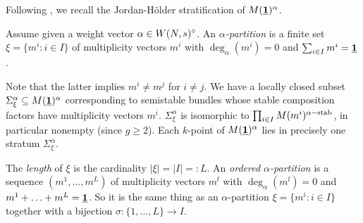 \documentclass{article}
\begin{document}
Following \cite{boden}, we recall the Jordan-H\"older stratification of $M(\underline{\mathbf{1}})^{\alpha}$.
\begin{defn}
  Assume given a weight vector $\alpha \in W(N, s)^{\circ}$. An \emph{$\alpha$-partition} is a finite set $\xi = \{m^i: i \in I\}$ of multiplicity vectors
  $m^i$ with $\deg_{\alpha}(m^i) = 0$ and $\sum_{i \in I} m^i = \underline{\mathbf{1}}$.
\end{defn}

Note that the latter implies $m^i \neq m^j$ for $i \neq j$. We have a locally closed subset $\Sigma^{\alpha}_{\xi} \subseteq M(\underline{\mathbf{1}})^{\alpha}$
corresponding to semistable bundles whose stable composition factors have multiplicity vectors $m^i$. $\Sigma^{\alpha}_{\xi}$ is isomorphic to $\prod_{i
\in I} M(m^i)^{\alpha-\mathrm{stab}}$, in particular nonempty (since $g \geq 2$). Each $k$-point of $M(\underline{\mathbf{1}})^{\alpha}$ lies in precisely one stratum
$\Sigma^{\alpha}_{\xi}$.

The \emph{length} of $\xi$ is the cardinality $|\xi| = |I| =: L$. An \emph{ordered $\alpha$-partition} is a sequence $(m^1, \ldots, m^L)$ of multiplicity
vectors $m^l$ with $\deg_{\alpha}(m^l) = 0$ and $m^1 + \ldots + m^L = \underline{\mathbf{1}}$. So it is the same thing as an $\alpha$-partition $\xi = \{m^i: i \in I\}$
together with a bijection $\sigma: \{1, \ldots, L\} \to I$.
\end{document}
